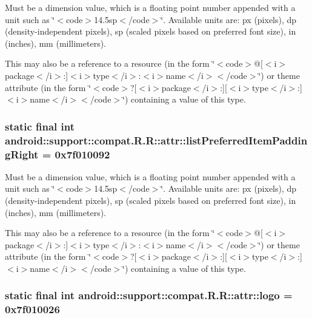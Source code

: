 Must be a dimension value, which is a floating point number appended with a unit such as \char`\"{}$<$code$>$14.5sp$<$/code$>$\char`\"{}. Available units are: px (pixels), dp (density-independent pixels), sp (scaled pixels based on preferred font size), in (inches), mm (millimeters). 

This may also be a reference to a resource (in the form \char`\"{}$<$code$>$@\mbox{[}$<$i$>$package$<$/i$>$:\mbox{]}$<$i$>$type$<$/i$>$:$<$i$>$name$<$/i$>$$<$/code$>$\char`\"{}) or theme attribute (in the form \char`\"{}$<$code$>$?\mbox{[}$<$i$>$package$<$/i$>$:\mbox{]}\mbox{[}$<$i$>$type$<$/i$>$:\mbox{]}$<$i$>$name$<$/i$>$$<$/code$>$\char`\"{}) containing a value of this type. \hypertarget{classandroid_1_1support_1_1compat_1_1_r_1_1attr_2f5f01c9c7c0d19210c8aa119f7d82a5}{
\subsubsection[{listPreferredItemPaddingRight}]{\setlength{\rightskip}{0pt plus 5cm}static final int android::support::compat.R.R::attr::listPreferredItemPaddingRight = 0x7f010092}}
\label{classandroid_1_1support_1_1compat_1_1_r_1_1attr_2f5f01c9c7c0d19210c8aa119f7d82a5}


Must be a dimension value, which is a floating point number appended with a unit such as \char`\"{}$<$code$>$14.5sp$<$/code$>$\char`\"{}. Available units are: px (pixels), dp (density-independent pixels), sp (scaled pixels based on preferred font size), in (inches), mm (millimeters). 

This may also be a reference to a resource (in the form \char`\"{}$<$code$>$@\mbox{[}$<$i$>$package$<$/i$>$:\mbox{]}$<$i$>$type$<$/i$>$:$<$i$>$name$<$/i$>$$<$/code$>$\char`\"{}) or theme attribute (in the form \char`\"{}$<$code$>$?\mbox{[}$<$i$>$package$<$/i$>$:\mbox{]}\mbox{[}$<$i$>$type$<$/i$>$:\mbox{]}$<$i$>$name$<$/i$>$$<$/code$>$\char`\"{}) containing a value of this type. \hypertarget{classandroid_1_1support_1_1compat_1_1_r_1_1attr_3d13f873bc2ef8c51c185d28e6368c94}{
\subsubsection[{logo}]{\setlength{\rightskip}{0pt plus 5cm}static final int android::support::compat.R.R::attr::logo = 0x7f010026}}
\label{classandroid_1_1support_1_1compat_1_1_r_1_1attr_3d13f873bc2ef8c51c185d28e6368c94}


